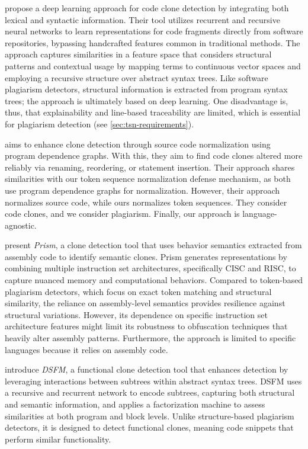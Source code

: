 \citet{white2016} propose a deep learning approach for code clone detection by integrating both lexical and syntactic information. Their tool utilizes recurrent and recursive neural networks to learn representations for code fragments directly from software repositories, bypassing handcrafted features common in traditional methods. The approach captures similarities in a feature space that considers structural patterns and contextual usage by mapping terms to continuous vector spaces and employing a recursive structure over abstract syntax trees.
Like software plagiarism detectors, structural information is extracted from program syntax trees; the approach is ultimately based on deep learning. One disadvantage is, thus, that explainability and line-based traceability are limited, which is essential for plagiarism detection (see \autoref{sec:tsn-requirements}).

\citet{ly2017} aims to enhance clone detection through source code normalization using program dependence graphs. With this, they aim to find code clones altered more reliably via renaming, reordering, or statement insertion.
Their approach shares similarities with our token sequence normalization defense mechanism, as both use program dependence graphs for normalization. However, their approach normalizes source code, while ours normalizes token sequences. They consider code clones, and we consider plagiarism. Finally, our approach is language-agnostic.

\citet{li2024} present \textit{Prism}, a clone detection tool that uses behavior semantics extracted from assembly code to identify semantic clones. Prism generates representations by combining multiple instruction set architectures, specifically CISC and RISC, to capture nuanced memory and computational behaviors.
%
Compared to token-based plagiarism detectors, which focus on exact token matching and structural similarity, the reliance on assembly-level semantics provides resilience against structural variations. However, its dependence on specific instruction set architecture features might limit its robustness to obfuscation techniques that heavily alter assembly patterns. Furthermore, the approach is limited to specific languages because it relies on assembly code.

\citet{xu2024} introduce \textit{DSFM}, a functional clone detection tool that enhances detection by leveraging interactions between subtrees within abstract syntax trees. DSFM uses a recursive and recurrent network to encode subtrees, capturing both structural and semantic information, and applies a factorization machine to assess similarities at both program and block levels.
%
Unlike structure-based plagiarism detectors, it is designed to detect functional clones, meaning code snippets that perform similar functionality.

